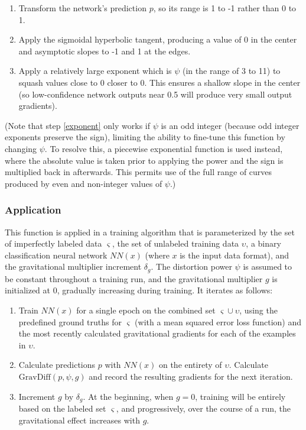\documentclass[10pt]{article}
\begin{document}
\begin{enumerate}
    \item Transform the network's prediction $p$, so its range is 1 to -1 rather than 0 to 1.
    \item Apply the sigmoidal hyperbolic tangent, producing a value of 0 in the center and asymptotic slopes to -1 and 1 at the edges.
    \item \label{exponent} Apply a relatively large exponent which is $\psi$ (in the range of 3 to 11) to squash values close to 0 closer to 0. This ensures a shallow slope in the center (so low-confidence network outputs near 0.5 will produce very small output gradients).
\end{enumerate}

(Note that step \ref{exponent} only works if $\psi$ is an odd integer (because odd integer exponents preserve the sign), limiting the ability to fine-tune this function by changing $\psi$. To resolve this, a piecewise exponential function is used instead, where the absolute value is taken prior to applying the power and the sign is multiplied back in afterwards. This permits use of the full range of curves produced by even and non-integer values of $\psi$.)

\subsubsection{Application}

This function is applied in a training algorithm that is parameterized by the set of imperfectly labeled data $\varsigma$, the set of unlabeled training data $\upsilon$, a binary classification neural network $NN(x)$ (where $x$ is the input data format), and the gravitational multiplier increment $\delta_g$. The distortion power $\psi$ is assumed to be constant throughout a training run, and the gravitational multiplier $g$ is initialized at 0, gradually increasing during training. It iterates as follows:

\begin{enumerate}
    \item Train $NN(x)$ for a single epoch on the combined set $\varsigma \cup \upsilon$, using the predefined ground truths for $\varsigma$ (with a mean squared error loss function) and the most recently calculated gravitational gradients for each of the examples in $\upsilon$.
    \item Calculate predictions $p$ with $NN(x)$ on the entirety of $\upsilon$. Calculate $\mathrm{GravDiff}(p, \psi, g)$ and record the resulting gradients for the next iteration.
    \item Increment $g$ by $\delta_{g}$. At the beginning, when $g = 0$, training will be entirely based on the labeled set $\varsigma$, and progressively, over the course of a run, the gravitational effect increases with $g$.
\end{enumerate}
\end{document}
